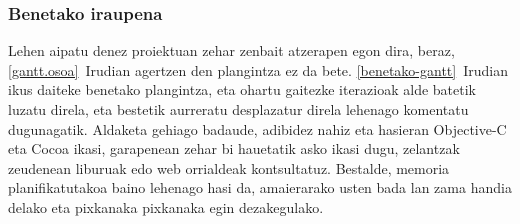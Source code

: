 \subsubsection{Benetako iraupena}
Lehen aipatu denez proiektuan zehar zenbait atzerapen egon dira, beraz, \ref{gantt.osoa}~Irudian agertzen den plangintza ez da bete. \ref{benetako-gantt}~Irudian ikus daiteke benetako plangintza, eta ohartu gaitezke iterazioak alde batetik luzatu direla, eta bestetik aurreratu desplazatur direla lehenago komentatu dugunagatik. Aldaketa gehiago badaude, adibidez nahiz eta hasieran Objective-C eta Cocoa ikasi, garapenean zehar bi hauetatik asko ikasi dugu, zelantzak zeudenean liburuak edo web orrialdeak kontsultatuz. Bestalde, memoria planifikatutakoa baino lehenago hasi da, amaierarako usten bada lan zama handia delako eta pixkanaka pixkanaka egin dezakegulako.
\begin{figure}[htp]
\begin{center}

\end{center}
\end{figure}
